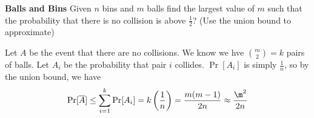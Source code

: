 \question \textbf{Balls and Bins}
Given $n$ bins and $m$ balls find the largest value of $m$ such that the probability that there is no collision is above $\frac{1}{2}$? (Use the union bound to approximate)
    \begin{solution} Let $A$ be the event that there are no collisions. We know we hve $\binom{m}{2} = k$ pairs of balls. Let $A_i$ be the probability that pair $i$ collides. $\Pr[A_i]$ is simply $\frac{1}{n}$, so by the union bound, we have 
    \[\Pr[\overline{A}] \leq \sum_{i=1}^{k} \Pr[A_i] = k \left(\frac{1}{n}\right) = \frac{m(m-1)}{2n}\approx \frac{\m^2}{2n}\]
\end{solution} 